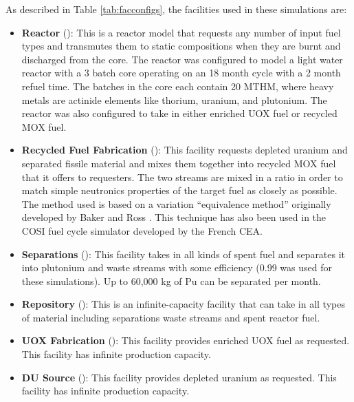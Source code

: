 As described in Table \ref{tab:facconfigs}, the facilities used in these simulations are:
\begin{itemize}

    \item \textbf{Reactor} (): This is a reactor
        model that requests any number of input fuel types and transmutes them
        to static compositions when they are burnt and discharged from the
        core. The reactor was configured to model a light water reactor
        with a 3 batch core operating on an 18 month
        cycle with a 2 month refuel time.  The batches in the core each contain 
        20 \gls{MTHM}, where heavy metals are actinide elements like thorium, 
        uranium, and plutonium. The reactor was also configured to
        take in either enriched \gls{UOX} fuel or recycled \gls{MOX} fuel.

    \item \textbf{Recycled Fuel Fabrication} (): This
        facility requests depleted uranium and separated fissile material and
        mixes them together into recycled \gls{MOX} fuel that it offers to
        requesters.  The two streams are mixed in a ratio in order to match
        simple neutronics properties of the target fuel as closely as
        possible.  The method used is based on a variation ``equivalence
        method'' originally developed by Baker and Ross
        \cite{baker_comparison_1963}.  This technique has also been used in the
        \gls{COSI} fuel cycle simulator developed by the French \gls{CEA}.

    \item \textbf{Separations} (): This facility
        takes in all kinds of spent fuel and separates it into plutonium and
        waste streams with some efficiency (0.99 was used for these
        simulations).  Up to 60,000 kg of Pu can be separated per month.

    \item \textbf{Repository} (): This is an
        infinite-capacity facility that can take in all types of material
        including separations waste streams and spent reactor fuel.

    \item \textbf{UOX Fabrication} (): This facility
        provides enriched \gls{UOX} fuel as requested.  This facility has infinite
        production capacity.

    \item \textbf{DU Source} (): This facility
        provides depleted uranium as requested. This facility has infinite
        production capacity.

\end{itemize}

